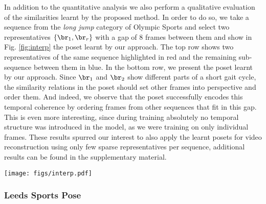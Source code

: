 \documentclass[10pt,twocolumn,letterpaper]{article}
\begin{document}
In addition to the quantitative analysis we also perform a qualitative evaluation of the similarities learnt by the proposed method. In order to do so, we take a sequence from the \textit{long jump} category of Olympic Sports and select two representatives $\{\br_1, \br_r\}$ with a gap of $8$ frames between them and show in Fig. \ref{fig:interp} the poset learnt by our approach. The top row shows two representatives of the same sequence highlighted in red and the remaining sub-sequence between them in blue. In the bottom row, we present the poset learnt by our approach.
Since $\br_1$ and $\br_2$ show different parts of a short gait cycle, the similarity relations in the poset should set other frames into perspective and order them.
And indeed, we observe that the poset successfully encodes this temporal coherence by ordering frames from other sequences that fit in this gap. This is even more interesting, since during training absolutely no temporal structure was introduced in the model, as we were training on only individual frames. These results spurred our interest to also apply the learnt posets for video reconstruction using only few sparse representatives per sequence, additional results can be found in the supplementary material.


\begin{figure*}[!t]
\texttt{[image: figs/interp.pdf]}
\caption{Partially ordered set learnt by the proposed approach. The top row shows two surrogate class representatives (highlighted in red) of the same sequence and the ground truth sub-sequence between them highlighted in blue. The bottom row shows the predicted poset highlighted in green, successfully capturing fine-grained similarities.}
\label{fig:interp}
\end{figure*}


\subsubsection{Leeds Sports Pose}
\end{document}
